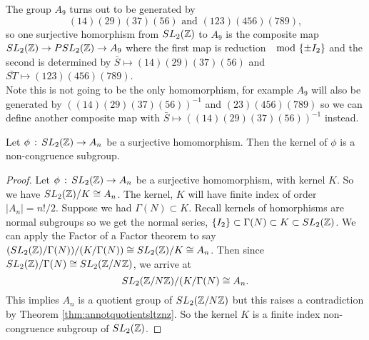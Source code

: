 \begin{example}
The group $A_9$ turns out to be generated by
$$(14)(29)(37)(56) \text{ and } (123)(456)(789),$$
so one surjective homorphism from $SL_2(\mathbb{Z})$ to $A_9$ is the composite map $SL_2(\mathbb{Z}) \rightarrow PSL_2(\mathbb{Z}) \rightarrow A_9$ where the first map is reduction $\mod {\{\pm I_2 \}}$ and the second is determined by $\bar{S} \mapsto (14)(29)(37)(56)$ and $\bar{ST} \mapsto (123)(456)(789)$. \\
Note this is not going to be the only homomorphism, for example $A_9$ will also be generated by $((14)(29)(37)(56))^{-1}$ and $(23)(456)(789)$ so we can define another composite map with $\bar{S} \mapsto ((14)(29)(37)(56))^{-1}$ instead. \\ 
\end{example}

\begin{corollary} \label{cor:annoncongruence}
Let $\phi \, : \, SL_2(\mathbb{Z}) \rightarrow A_n$ be a surjective homomorphism. Then the kernel of $\phi$ is a non-congruence subgroup. 
\end{corollary}

\begin{proof}
Let $\phi \, : \, SL_2(\mathbb{Z}) \rightarrow A_n$ be a surjective homomorphism, with kernel $K$. So we have $SL_2(\mathbb{Z}) / K \cong A_n$. The kernel, $K$ will have finite index of order $\vert A_n \vert = n!/2$. Suppose we had $\Gamma(N) \subset K$. Recall kernels of homorphisms are normal subgroups so we get the normal series, $\{I_2\} \subset \Gamma(N) \subset K \subset SL_2(\mathbb{Z})$. We can apply the Factor of a Factor theorem to say $  (SL_2(\mathbb{Z}) / \Gamma(N)) / (K / \Gamma(N)) \cong SL_2(\mathbb{Z}) / K \cong A_n$. Then since $SL_2(\mathbb{Z}) / \Gamma(N) \cong SL_2(\mathbb{Z}/N\mathbb{Z})$, we arrive at 
$$SL_2(\mathbb{Z}/N\mathbb{Z}) / (K/ \Gamma(N) \cong A_n.$$
This implies $A_n$ is a quotient group of $SL_2(\mathbb{Z}/N\mathbb{Z})$ but this raises a contradiction by Theorem \ref{thm:annotquotientsltznz}. So the kernel $K$ is a finite index non-congruence subgroup of $SL_2(\mathbb{Z})$.
\end{proof}

